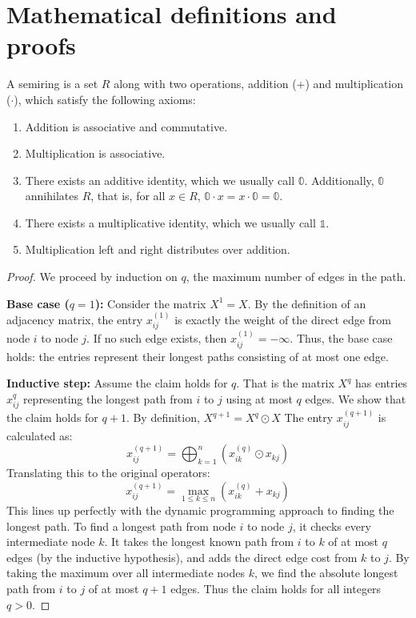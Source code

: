 \chapter{Mathematical definitions and proofs} \label{apdx:proofs}

\begin{definition}[Semiring] \label{def:semiring}
  A semiring \cite{Wandsnider2020} is a set $R$ along with two operations, addition (+) and multiplication ($\cdot$), which satisfy the 
  following axioms:

  \begin{enumerate}
    \item Addition is associative and commutative.
    \item Multiplication is associative.
    \item There exists an additive identity, which we usually call $\mathbb{0}$. Additionally, $\mathbb{0}$ annihilates 
      $R$, that is, for all $x \in R$, $\mathbb{0} \cdot x = x \cdot \mathbb{0} = \mathbb{0}$.
    \item There exists a multiplicative identity, which we usually call $\mathbb{1}$.
    \item Multiplication left and right distributes over addition.
  \end{enumerate}
\end{definition}

\MatrixExp*
\begin{proof}
  We proceed by induction on $q$, the maximum number of edges in the path.

  \textbf{Base case ($q = 1$):} Consider the matrix $X^1=X$. By the definition of an adjacency matrix, the entry  
  $x_{ij}^{(1)}$ is exactly the weight of the direct edge from node $i$ to node $j$. If no such edge exists, then 
  $x_{ij}^{(1)} = -\infty$. Thus, the base case holds: the entries represent their longest paths consisting of at most 
  one edge.

  \textbf{Inductive step:} Assume the claim holds for $q$. That is the matrix $X^{q}$ has entries $x_{ij}^{q}$ 
  representing the longest path from $i$ to $j$ using at most $q$ edges.
  We show that the claim holds for $q+1$. By definition, $X^{q+1} = X^{q} \odot X$
  The entry $x_{ij}^{(q+1)}$ is calculated as:
  $$x_{ij}^{(q+1)} = \bigoplus_{k=1}^{n} (x_{ik}^{(q)}\odot x_{kj})$$
  Translating this to the original operators:
  $$
  x_{ij}^{(q+1)} = \max_{1 \leq k \leq n} (x_{ik}^{(q)} + x_{kj})
  $$
  This lines up perfectly with the dynamic programming approach to finding the longest path. To find a longest path from
  node $i$ to node $j$, it checks every intermediate node $k$. It takes the longest known path from $i$ to $k$ of at most 
  $q$ edges (by the inductive hypothesis), and adds the direct edge cost from $k$ to $j$. By taking the maximum over all 
  intermediate nodes $k$, we find the absolute longest path from $i$ to $j$ of at most $q+1$ edges. Thus the claim holds 
  for all integers $q>0$.
\end{proof}

